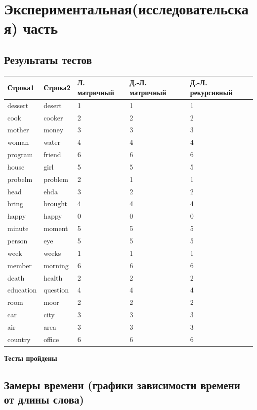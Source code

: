 \documentclass[a4paper,14pt]{report} %
\begin{document}
\chapter{Экспериментальная(исследовательская) часть}
\section{Результаты тестов}

\begin{tabular}{ | l | l | l | l | l |}
\hline
\textbf{Строка1} & \textbf{Строка2} & \textbf{Л. матричный} & \textbf{Д.-Л. матричный}  & \textbf{Д.-Л. рекурсивный}\\ \hline
dessert  &  desert  &  1  &  1  &  1 \\ \hline
cook  &  cooker  &  2  &  2  &  2 \\ \hline
mother  &  money  &  3  &  3  &  3 \\ \hline
woman  &  water  &  4  &  4  &  4 \\ \hline
program  &  friend  &  6  &  6  &  6 \\ \hline
house  &  girl  &  5  &  5  &  5 \\ \hline
probelm  &  problem  &  2  &  1  &  1 \\ \hline
head  &  ehda  &  3  &  2  &  2 \\ \hline
bring  &  brought  &  4  &  4  &  4 \\ \hline
happy  &  happy  &  0  &  0  &  0 \\ \hline
minute  &  moment  &  5  &  5  &  5 \\ \hline
person  &  eye  &  5  &  5  &  5 \\ \hline
week  &  weeks  &  1  &  1  &  1 \\ \hline
member  &  morning  &  6  &  6  &  6 \\ \hline
death  &  health  &  2  &  2  &  2 \\ \hline
education  &  question  &  4  &  4  &  4 \\ \hline
room  &  moor  &  2  &  2  &  2 \\ \hline
car  &  city  &  3  &  3  &  3 \\ \hline
air  &  area  &  3  &  3  &  3 \\ \hline
country  &  office  &  6  &  6  &  6 \\ \hline
\end{tabular}

\textbf{Тесты пройдены}

\section{Замеры времени (графики зависимости времени от длины слова)}
\end{document}
